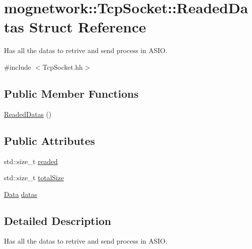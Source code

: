\hypertarget{structmognetwork_1_1_tcp_socket_1_1_readed_datas}{\section{mognetwork\-:\-:Tcp\-Socket\-:\-:Readed\-Datas Struct Reference}
\label{structmognetwork_1_1_tcp_socket_1_1_readed_datas}
}


Has all the datas to retrive and send process in A\-S\-I\-O.  




{\ttfamily \#include $<$Tcp\-Socket.\-hh$>$}

\subsection*{Public Member Functions}
\begin{DoxyCompactItemize}
\item 
\hyperlink{structmognetwork_1_1_tcp_socket_1_1_readed_datas_a5f000677cc0bfc88c3ab563ede5907ab}{Readed\-Datas} ()
\end{DoxyCompactItemize}
\subsection*{Public Attributes}
\begin{DoxyCompactItemize}
\item 
std\-::size\-\_\-t \hyperlink{structmognetwork_1_1_tcp_socket_1_1_readed_datas_a2c633a79efa956f1f59d9429e8584cc0}{readed}
\item 
std\-::size\-\_\-t \hyperlink{structmognetwork_1_1_tcp_socket_1_1_readed_datas_aac0aa498d4b98296434cf05785068dcc}{total\-Size}
\item 
\hyperlink{classmognetwork_1_1_tcp_socket_aa80d910649a16cedb6c98297e5893ed1}{Data} \hyperlink{structmognetwork_1_1_tcp_socket_1_1_readed_datas_abfdc3750f4970fde4212d7a0e934daa9}{datas}
\end{DoxyCompactItemize}


\subsection{Detailed Description}
Has all the datas to retrive and send process in A\-S\-I\-O. 


